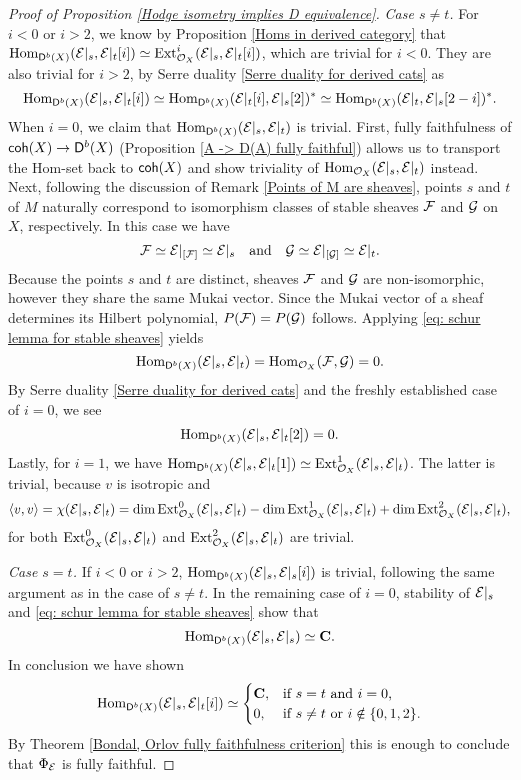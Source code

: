 \begin{proof}[Proof of Proposition \ref{Hodge isometry implies D equivalence}]
    \vspace{0.3cm}
    \noindent
    \textsl{Case $s \neq t$.}  
    For $i < 0$ or $i > 2$, we know by Proposition \ref{Homs in derived category} that $\operatorname{Hom}_{\mathsf{D}^b(X)}(\mathcal E|_s, \mathcal E|_t[i]) \simeq \operatorname{Ext}^i_{{\mathcal{O}_{X}}}(\mathcal E|_s, \mathcal E|_t[i])$, which are trivial for $i < 0$. They are also trivial for $i > 2$, by Serre duality \ref{Serre duality for derived cats} as
    \[
        \operatorname{Hom}_{\mathsf{D}^b(X)}(\mathcal E|_s, \mathcal E|_t[i]) \simeq \operatorname{Hom}_{\mathsf{D}^b(X)}(\mathcal E|_t[i], \mathcal E|_s[2])^* \simeq \operatorname{Hom}_{\mathsf{D}^b(X)}(\mathcal E|_t, \mathcal E|_s[2-i])^*.
    \]
    When $i = 0$, we claim that $\operatorname{Hom}_{\mathsf{D}^b(X)}(\mathcal E|_s, \mathcal E|_t)$ is trivial. First, fully faithfulness of $\mathsf{coh}(X) \to \mathsf{D}^b(X)$ (\cf Proposition \ref{A -> D(A) fully faithful}) allows us to transport the Hom-set back to $\mathsf{coh}(X)$ and show triviality of $\operatorname{Hom}_{{\mathcal{O}_{X}}}(\mathcal E|_s, \mathcal E|_t)$ instead. Next, following the discussion of Remark \ref{Points of M are sheaves}, points $s$ and $t$ of $M$ naturally correspond to isomorphism classes of stable sheaves $\mathcal F$ and $\mathcal G$ on $X$, respectively. In this case we have
    \[
        \mathcal F \simeq \mathcal E|_{[\mathcal F]} \simeq \mathcal E|_s \quad \text{and} \quad \mathcal G \simeq \mathcal E|_{[\mathcal G]} \simeq \mathcal E|_t.
    \]
    Because the points $s$ and $t$ are distinct, sheaves $\mathcal F$ and $\mathcal G$ are non-isomorphic, however they share the same Mukai vector. Since the Mukai vector of a sheaf determines its Hilbert polynomial, $P(\mathcal F) = P(\mathcal G)$ follows. Applying \eqref{eq: schur lemma for stable sheaves} yields 
    \[
        \operatorname{Hom}_{\mathsf{D}^b(X)}(\mathcal E|_s, \mathcal E|_t) = \operatorname{Hom}_{{\mathcal{O}_{X}}}(\mathcal F, \mathcal G)= 0. 
    \]
    By Serre duality \ref{Serre duality for derived cats} and the freshly established case of $i = 0$, we see 
    \[
        \operatorname{Hom}_{\mathsf{D}^b(X)}(\mathcal E|_s, \mathcal E|_t[2]) = 0.
    \]
    Lastly, for $i = 1$, we have $\operatorname{Hom}_{\mathsf{D}^b(X)}(\mathcal E|_s, \mathcal E|_t[1]) \simeq \operatorname{Ext}^1_{\mathcal{O}_{X}}(\mathcal E|_s, \mathcal E|_t)$. The latter is trivial, because $v$ is isotropic and 
    \[
        \langle v, v \rangle = \chi(\mathcal E|_s, \mathcal E|_t) = \dim\operatorname{Ext}^0_{\mathcal{O}_{X}}(\mathcal E|_s, \mathcal E|_t) - \dim\operatorname{Ext}^1_{\mathcal{O}_{X}}(\mathcal E|_s, \mathcal E|_t) + \dim\operatorname{Ext}^2_{\mathcal{O}_{X}}(\mathcal E|_s, \mathcal E|_t),
    \]
    for both $\operatorname{Ext}^0_{\mathcal{O}_{X}}(\mathcal E|_s, \mathcal E|_t)$ and $\operatorname{Ext}^2_{\mathcal{O}_{X}}(\mathcal E|_s, \mathcal E|_t)$ are trivial.

    \vspace{0.3cm}
    \noindent
    \textsl{Case $s = t$.}
    If $i < 0$ or $i > 2$, $\operatorname{Hom}_{\mathsf{D}^b(X)}(\mathcal E|_s, \mathcal E|_s[i])$ is trivial, following the same argument as in the case of $s \neq t$. In the remaining case of $i = 0$, stability of $\mathcal E|_s$ and \eqref{eq: schur lemma for stable sheaves} show that 
    \[
        \operatorname{Hom}_{\mathsf{D}^b(X)}(\mathcal E|_s, \mathcal E|_s) \simeq \mathbf C.
    \]
    In conclusion we have shown
    \begin{equation}
            \operatorname{Hom}_{\mathsf{D}^b(X)}(\mathcal E|_s, \mathcal E|_t[i]) \simeq \begin{cases}
                \mathbf C, &\text{if $s = t$ and $i = 0$,} \\
                0, &\text{if $s \neq t$ or $i \notin \{0,1,2\}$.}
            \end{cases}
    \end{equation}
    By Theorem \ref{Bondal, Orlov fully faithfulness criterion} this is enough to conclude that $\Phi_{\mathcal E}$ is fully faithful. 


\end{proof}
